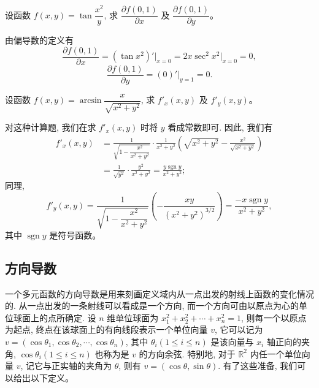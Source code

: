 \documentclass[12pt,fontset=fandol]{ctexart}
\begin{document}
\begin{example}\label{course-example-14-1-1}\quad 设函数 $f(x,y)=\tan\dfrac{x^2}{y}$, 求 $\dfrac{\partial f(0,1)}{\partial x}$ 及 $\dfrac{\partial f(0,1)}{\partial y}$。

\end{example}
\begin{solve}\quad 由偏导数的定义有
\[
  \frac{\partial f(0,1)}{\partial x}
  =(\tan x^2)'\big|_{x=0}
  =2x\sec^2 x^2\big|_{x=0}=0,
\]
\[
  \frac{\partial f(0,1)}{\partial y}
  =(0)'\big|_{y=1}=0.
\]

\end{solve}
\begin{example}\label{course-example-14-1-2}\quad 设函数 $f(x,y)=\arcsin\dfrac{x}{\sqrt{x^2+y^2}}$, 求 $f'_x(x,y)$ 及 $f'_y(x,y)$。

\end{example}
\begin{solve}\quad 对这种计算题, 我们在求 $f'_x(x,y)$ 时将 $y$ 看成常数即可. 因此, 我们有
\[
\begin{aligned}
  f'_x(x,y)
  &=
  \frac{1}{\sqrt{1-\dfrac{x^2}{x^2+y^2}}}\cdot
  \frac{1}{x^2+y^2}
  \left(\sqrt{x^2+y^2}-\frac{x^2}{\sqrt{x^2+y^2}}\right)\\
  &=\frac{1}{\sqrt{y^2}}\cdot\frac{y^2}{x^2+y^2}
  =\frac{y\operatorname{sgn} y}{x^2+y^2};
\end{aligned}
\]
同理,
\[
  f'_y(x,y)
  =
  \frac{1}{\sqrt{1-\dfrac{x^2}{x^2+y^2}}}
  \left(-\frac{xy}{(x^2+y^2)^{3/2}}\right)
  =\frac{-x\operatorname{sgn} y}{x^2+y^2},
\]
其中 $\operatorname{sgn} y$ 是符号函数。

\end{solve}
\subsection{方向导数}

一个多元函数的方向导数是用来刻画定义域内从一点出发的射线上函数的变化情况的. 从一点出发的一条射线可以看成是一个方向, 而一个方向可由以原点为心的单位球面上的点所确定. 设 $n$ 维单位球面为 $x_1^2+x_2^2+\cdots+x_n^2=1$, 则每一个以原点为起点, 终点在该球面上的有向线段表示一个单位向量 $v$, 它可以记为 $v=(\cos\theta_1,\cos\theta_2,\cdots,\cos\theta_n)$, 其中 $\theta_i(1\leqslant i\leqslant n)$ 是该向量与 $x_i$ 轴正向的夹角, $\cos\theta_i(1\leqslant i\leqslant n)$ 也称为是 $v$ 的方向余弦. 特别地, 对于 $\mathbb R^2$ 内任一个单位向量 $v$, 记它与正实轴的夹角为 $\theta$, 则有 $v=(\cos\theta,\sin\theta)$. 有了这些准备, 我们可以给出以下定义。
\end{document}
